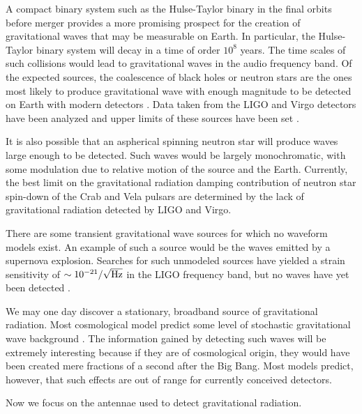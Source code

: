 A compact binary system such as the Hulse-Taylor binary in the final orbits before merger provides a more promising prospect for the creation of gravitational waves that may be measurable on Earth. %
In particular, the Hulse-Taylor binary system will decay in a time of order $10^8$ years. %
The time scales of such collisions would lead to gravitational waves in the audio frequency band. %
Of the expected sources, the coalescence of black holes or neutron stars are the ones most likely to produce gravitational wave with enough magnitude to be detected on Earth with modern detectors \cite{CBCrates}. %
Data taken from the LIGO and Virgo detectors have been analyzed and upper limits of these sources have been set \cite{CBC,CBCblackholes}.

It is also possible that an aspherical spinning neutron star will produce waves large enough to be detected. %
Such waves would be largely monochromatic, with some modulation due to relative motion of the source and the Earth. %
Currently, the best limit on the gravitational radiation damping contribution of neutron star spin-down of the Crab\cite{Crab} and Vela\cite{Vela} pulsars are determined by the lack of gravitational radiation detected by LIGO and Virgo.

There are some transient gravitational wave sources for which no waveform models exist. %
An example of such a source would be the waves emitted by a supernova explosion. %
Searches for such unmodeled sources have yielded a strain sensitivity of $\sim 10^{-21} / \sqrt{\rm{Hz}}$ in the LIGO frequency band, but no waves have yet been detected \cite{bursts}.

We may one day discover a stationary, broadband source of gravitational radiation. %
Most cosmological model predict some level of stochastic gravitational wave background \cite{bbn,stochdirectional}. %
The information gained by detecting such waves will be extremely interesting because if they are of cosmological origin, they would have been created mere fractions of a second after the Big Bang. %
Most models predict, however, that such effects are out of range for currently conceived detectors.

Now we focus on the antennae used to detect gravitational radiation.
